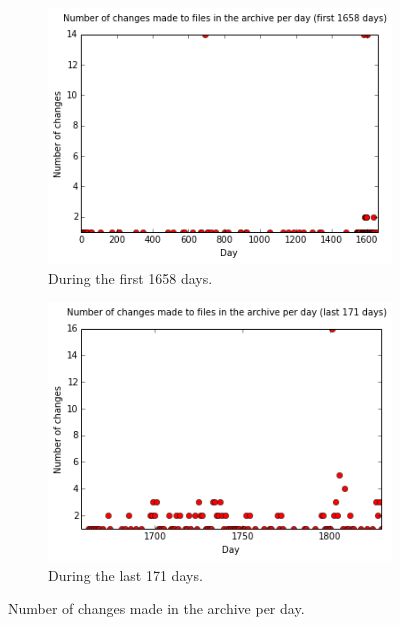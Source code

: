 \documentclass[11pt]{article}
\begin{document}
\begin{figure}
\centering
\begin{subfigure}{.5\textwidth}
  \centering
  \includegraphics[width=\linewidth]{images/changes_per_day_first.png}
  \caption{During the first 1658 days.}
\end{subfigure}%
\begin{subfigure}{.5\textwidth}
  \centering
  \includegraphics[width=\linewidth]{images/changes_per_day_last.png}
  \caption{During the last 171 days.}
\end{subfigure}
\caption{Number of changes made in the archive per day.}
\label{fig:changes_per_day}
\end{figure}
\end{document}
